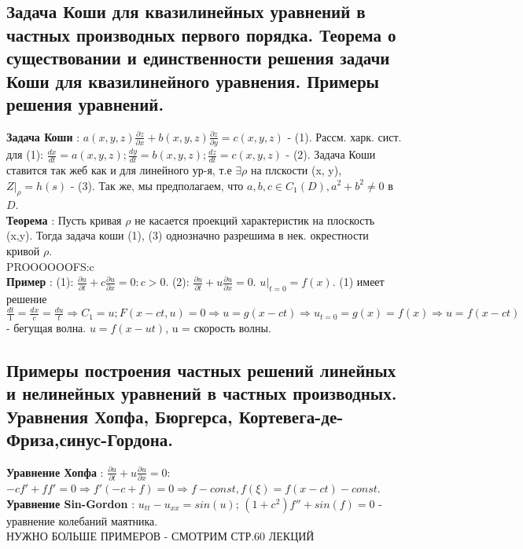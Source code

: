 \documentclass[unicode, 8pt, a4paper,oneside, landscape]{article}
\begin{document}
\begin{multicols}{4}
\subsection{Задача Коши для квазилинейных  уравнений в частных производных первого порядка. Теорема о существовании и единственности решения задачи Коши для квазилинейного уравнения. Примеры решения уравнений.}

{\bf Задача Коши} : $a(x, y, z)\frac{\partial z}{\partial x} + b(x, y, z)\frac{\partial z}{\partial y} = c(x, y, z)$ - (1). Рассм. харк. сист. для (1): $\frac{dx}{dt} = a(x, y, z); \frac{dy}{dt} = b(x, y, z); \frac{dz}{dt} = c(x, y, z)$ - (2). Задача Коши ставится так жеб как и для линейного ур-я, т.е $\exists \rho$ на плскости (x, y), $Z|_\rho = h(s)$ - (3). Так же, мы предполагаем, что $a, b, c \in C_1(D), a^2 + b^2 \neq 0$ в $D$.\\
{\bf Теорема} : Пусть кривая $\rho$ не касается проекций характеристик на плоскость (x,y). Тогда задача коши (1), (3) однозначно разрешима в нек. окрестности кривой $\rho$.\\ PROOOOOOFS:c\\
{\bf Пример} : (1): $\frac{\partial u}{\partial t} + c\frac{\partial u}{\partial x} = 0: c>0$. (2): $\frac{\partial u}{\partial t} + u\frac{\partial u}{\partial x} = 0$. $u|_{t=0} = f(x)$. (1) имеет решение $\frac{dt}{1} = \frac{dx}{c} = \frac{du}{t} \Rightarrow C_1 = u; F(x-ct, u) = 0 \Rightarrow u = g(x-ct) \Rightarrow u_{t=0} = g(x) = f(x) \Rightarrow u =f(x-ct)$ - бегущая волна. $u=f(x - ut)$, u = скорость волны. 


\subsection{Примеры построения частных решений линейных и нелинейных уравнений в частных производных. Уравнения Хопфа, Бюргерса, Кортевега-де-Фриза,синус-Гордона.}

{\bf Уравнение Хопфа} : $\frac{\partial u}{\partial t} + u\frac{\partial u}{\partial x} = 0$: $-cf' + ff' = 0 \Rightarrow f'(-c+f) = 0 \Rightarrow f - const, f(\xi) = f(x-ct) - const$.\\
{\bf Уравнение Sin-Gordon} : $u_{tt} - u_{xx} = sin(u)$; $(1+c^2)f'' + sin(f) = 0$ - уравнение колебаний маятника.\\
НУЖНО БОЛЬШЕ ПРИМЕРОВ - СМОТРИМ СТР.60 ЛЕКЦИЙ



\end{multicols}
\end{document}
